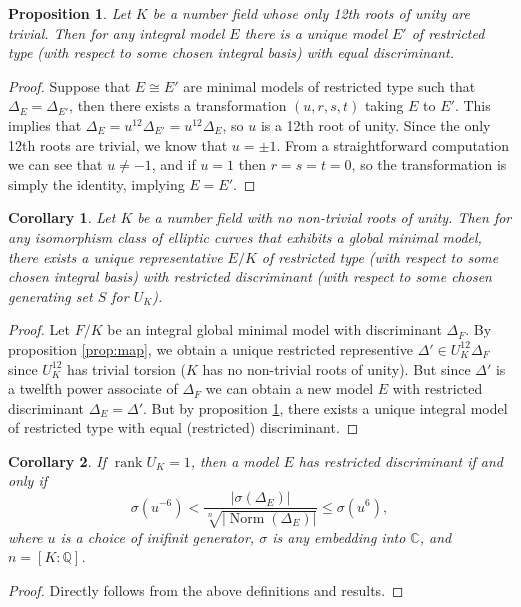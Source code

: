 \documentclass{amsart}
\newcommand{\C}{\mathbb{C}}
\newcommand{\Q}{\mathbb{Q}}
\DeclareMathOperator{\Norm}{Norm}
\DeclareMathOperator{\rank}{rank}
\newtheorem{proposition}{Proposition}
\newtheorem{corollary}{Corollary}
\begin{document}
\begin{proposition}\label{prop:uniq}
  Let $K$ be a number field whose only 12th roots of unity
  are trivial. Then for any integral model $E$ there is a unique model $E'$ of
  restricted type (with respect to some chosen integral basis) with equal
  discriminant.
\end{proposition}

\begin{proof}
  Suppose that $E\cong E'$ are minimal models of restricted type such that
  $\Delta_E=\Delta_{E'}$, then there exists a transformation $(u,r,s,t)$
  taking $E$ to $E'$. This implies that
  $\Delta_E=u^{12}\Delta_{E'}=u^{12}\Delta_E$, so $u$ is a 12th root of unity.
  Since the only 12th roots are trivial, we know that $u=\pm1$. From a
  straightforward computation we can see that $u\neq -1$, and if $u=1$
  then $r=s=t=0$, so the transformation is simply the identity, implying
  $E=E'$.
\end{proof}


\begin{corollary}
  Let $K$ be a number field with no non-trivial roots of unity. Then for any
  isomorphism class of elliptic curves that exhibits a global minimal model,
  there exists a unique representative $E/K$ of restricted type (with respect
  to some chosen integral basis) with restricted discriminant (with respect to
  some chosen generating set $S$ for $U_K$).
\end{corollary}
\begin{proof}
  Let $F/K$ be an integral global minimal model with discriminant $\Delta_F$.
  By proposition \ref{prop:map}, we obtain a unique
  restricted representive $\Delta' \in U_K^{12}\Delta_F$ since $U_K^{12}$ has
  trivial torsion ($K$ has no non-trivial roots of unity). But since $\Delta'$
  is a twelfth power associate of $\Delta_F$ we can obtain a new model $E$
  with restricted discriminant $\Delta_E=\Delta'$. But by proposition
  \ref{prop:uniq}, there exists a unique integral model of restricted type with
  equal (restricted) discriminant.
\end{proof}
\begin{corollary}
  If $\rank U_K = 1$, then a model $E$ has restricted discriminant if and only
  if
  \[ \sigma(u^{-6}) < \frac{|\sigma(\Delta_E)|}{\sqrt[n]{|\Norm(\Delta_E)|}} \leq \sigma(u^6), \]
  where $u$ is a choice of inifinit generator, $\sigma$ is any embedding into
  $\C$, and $n = [K:\Q]$.
\end{corollary}
\begin{proof}
  Directly follows from the above definitions and results.
\end{proof}
\end{document}

